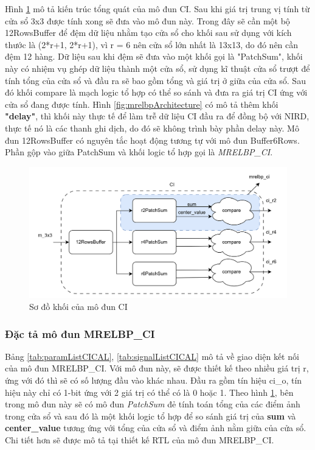 Hình \ref{fig:ciArch} mô tả kiến trúc tổng quát của mô đun CI. Sau khi giá trị trung vị tính từ cửa sổ 3x3 được tính xong sẽ đưa vào mô đun này. Trong đây sẽ cần một bộ 12RowsBuffer để đệm dữ liệu nhằm tạo cửa sổ cho khối sau sử dụng với kích thước là (2*r+1, 2*r+1), vì r = 6 nên cửa sổ lớn nhất là 13x13, do đó nên cần đệm 12 hàng. Dữ liệu sau khi đệm sẽ đưa vào một khối gọi là "PatchSum", khối này có nhiệm vụ ghép dữ liệu thành một cửa sổ, sử dụng kĩ thuật cửa sổ trượt để tính tổng của cửa sổ và đầu ra sẽ bao gồm tổng và giá trị ở giữa của cửa sổ. Sau đó khối compare là mạch logic tổ hợp có thể so sánh và đưa ra giá trị CI ứng với cửa sổ đang được tính. Hình \ref{fig:mrelbpArchitecture} có mô tả thêm khối \textbf{"delay"}, thì khối này thực tế để làm trễ dữ liệu CI đầu ra để đồng bộ với NIRD, thực tế nó là các thanh ghi dịch, do đó sẽ không trình bày phần delay này. Mô đun 12RowsBuffer có nguyên tắc hoạt động tương tự với mô đun Buffer6Rows. Phần gộp vào giữa PatchSum và khối logic tổ hợp gọi là \textit{MRELBP\_CI}. 

\begin{figure}[!ht]
    \centering
    \includegraphics[width=\linewidth]{figures/ciArch.png}
    \caption{Sơ đồ khối của mô đun CI}
    \label{fig:ciArch}
\end{figure}

\subsubsection{Đặc tả mô đun MRELBP\_CI}
Bảng \ref{tab:paramListCICAL}, \ref{tab:signalListCICAL} mô tả về giao diện kết nối của mô đun MRELBP\_CI. Với mô đun này, sẽ được thiết kế theo nhiều giá trị r, ứng với đó thì sẽ có số lượng đầu vào khác nhau. Đầu ra gồm tín hiệu ci\_o, tín hiệu này chỉ có 1-bit ứng với 2 giá trị có thể có là 0 hoặc 1. Theo hình \ref{fig:ciArch}, bên trong mô đun này sẽ có mô đun \textit{PatchSum} đẻ tính toán tổng của các điểm ảnh trong cửa sổ và sau đó là một khối logic tổ hợp để so sánh giá trị của \textbf{sum} và \textbf{center\_value} tương ứng với tổng của cửa sổ và điểm ảnh nằm giữa của cửa sổ. Chi tiết hơn sẽ được mô tả tại thiết kế RTL của mô đun MRELBP\_CI. 


